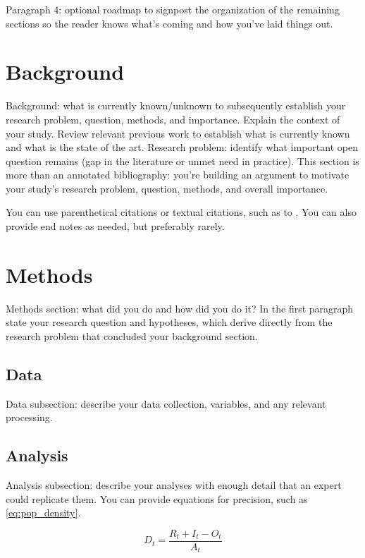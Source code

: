 \documentclass[12pt,letterpaper]{article} %
\begin{document}
Paragraph 4: optional roadmap to signpost the organization of the remaining sections so the reader knows what's coming and how you've laid things out.

\section{Background}

Background: what is currently known/unknown to subsequently establish your research problem, question, methods, and importance. Explain the context of your study. Review relevant previous work to establish what is currently known and what is the state of the art. Research problem: identify what important open question remains (gap in the literature or unmet need in practice). This section is more than an annotated bibliography: you're building an argument to motivate your study's research problem, question, methods, and overall importance.

You can use parenthetical citations \citep[e.g.,][]{boeing_off_2021} or textual citations, such as to \citet[][pp. 93--94]{boarnet_travel_2001}. You can also provide end notes as needed, but preferably rarely.

\section{Methods}

Methods section: what did you do and how did you do it? In the first paragraph state your research question and hypotheses, which derive directly from the research problem that concluded your background section.

\subsection{Data}

Data subsection: describe your data collection, variables, and any relevant processing.

\subsection{Analysis}

Analysis subsection: describe your analyses with enough detail that an expert could replicate them. You can provide equations for precision, such as \autoref{eq:pop_density}.

\begin{equation}
  \label{eq:pop_density}
  D_t = \frac{R_t + I_t - O_t}{A_t}
\end{equation}
\end{document}
